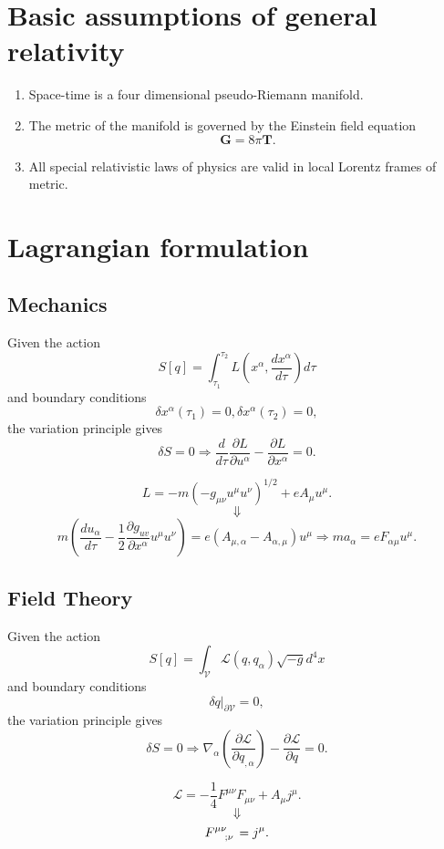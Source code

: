 \section{Basic assumptions of general relativity}
\begin{enumerate}
\item Space-time is a four dimensional pseudo-Riemann manifold.
\item The metric of the manifold is governed by the Einstein field equation
\[\bm{G} = 8\pi\bm{T}.\]
\item  All special relativistic laws of physics are valid in local Lorentz frames of metric.
\end{enumerate}

\section{Lagrangian formulation}
\subsection{Mechanics}
Given the action
\[S[q] = \int_{\tau_1}^{\tau_2} L(x^{\alpha},\frac{dx^{\alpha}}{d\tau}) d\tau\]
and boundary conditions
\[\delta x^{\alpha}(\tau_1)=0, \delta x^{\alpha}(\tau_2)=0,\]
the variation principle gives
\[\delta S = 0 \Rightarrow \frac{d}{d\tau} \frac{\partial L}{\partial u^{\alpha}} - \frac{\partial L}{\partial x^{\alpha}}=0.\]
\begin{example}
\[L = -m(-g_{\mu\nu} u^{\mu} u^{\nu})^{1/2} + e A_{\mu} u^{\mu}.\]
\[\Downarrow\]
\[m(\frac{du_{\alpha}}{d\tau} - \frac{1}{2} \frac{\partial g_{uv}}{\partial x^{\alpha}} u^{\mu} u^{\nu}) = e(A_{\mu,\alpha}-A_{\alpha,\mu})u^{\mu} \Rightarrow ma_{\alpha} = eF_{\alpha\mu} u^{\mu} .\]
\end{example}

\subsection{Field Theory}
Given the action
\[S[q] = \int_{\mathcal{V}} \mathcal{L}(q,q_{\alpha})\sqrt{-g} d^4x\]
and boundary conditions
\[\delta q|_{\partial \mathcal{V}} = 0,\]
the variation principle gives
\[\delta S = 0 \Rightarrow \nabla_{\alpha} (\frac{\partial \mathcal{L}}{\partial q_{,\alpha}}) - \frac{\partial \mathcal{L}}{\partial q} = 0.\]
\begin{example}
\[\mathcal{L} = -\frac{1}{4} F^{\mu \nu} F_{\mu \nu} + A_{\mu} j^{\mu}.\]
\[\Downarrow\]
\[\tensor{F}{^{\mu \nu}_{;\nu}} = j^{\mu}.\]
\end{example}


